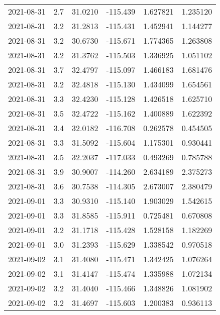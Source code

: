 \begin{tabular}{lrrrrr}
2021-08-31 &       2.7 &  31.0210 &  -115.439 &         1.627821 &         1.235120 \\
2021-08-31 &       3.2 &  31.2813 &  -115.431 &         1.452941 &         1.144277 \\
2021-08-31 &       3.2 &  30.6730 &  -115.671 &         1.774365 &         1.263808 \\
2021-08-31 &       3.2 &  31.3762 &  -115.503 &         1.336925 &         1.051102 \\
2021-08-31 &       3.7 &  32.4797 &  -115.097 &         1.466183 &         1.681476 \\
2021-08-31 &       3.2 &  32.4818 &  -115.130 &         1.434099 &         1.654561 \\
2021-08-31 &       3.3 &  32.4230 &  -115.128 &         1.426518 &         1.625710 \\
2021-08-31 &       3.5 &  32.4722 &  -115.162 &         1.400889 &         1.622392 \\
2021-08-31 &       3.4 &  32.0182 &  -116.708 &         0.262578 &         0.454505 \\
2021-08-31 &       3.3 &  31.5092 &  -115.604 &         1.175301 &         0.930441 \\
2021-08-31 &       3.5 &  32.2037 &  -117.033 &         0.493269 &         0.785788 \\
2021-08-31 &       3.9 &  30.9007 &  -114.260 &         2.634189 &         2.375273 \\
2021-08-31 &       3.6 &  30.7538 &  -114.305 &         2.673007 &         2.380479 \\
2021-09-01 &       3.3 &  30.9310 &  -115.140 &         1.903029 &         1.542615 \\
2021-09-01 &       3.3 &  31.8585 &  -115.911 &         0.725481 &         0.670808 \\
2021-09-01 &       3.2 &  31.1718 &  -115.428 &         1.528158 &         1.182269 \\
2021-09-01 &       3.0 &  31.2393 &  -115.629 &         1.338542 &         0.970518 \\
2021-09-02 &       3.1 &  31.4080 &  -115.471 &         1.342425 &         1.076264 \\
2021-09-02 &       3.1 &  31.4147 &  -115.474 &         1.335988 &         1.072134 \\
2021-09-02 &       3.2 &  31.4040 &  -115.466 &         1.348826 &         1.081902 \\
2021-09-02 &       3.2 &  31.4697 &  -115.603 &         1.200383 &         0.936113 \\

\end{tabular}
